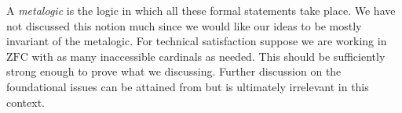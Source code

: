 \begin{remark}
    A \emph{metalogic} is the logic in which all these formal statements take place. We have not discussed this notion much since we would like our ideas to be mostly invariant of the metalogic. For technical satisfaction suppose we are working in $\mathrm{ZFC}$ with as many inaccessible cardinals as needed. This should be sufficiently strong enough to prove what we discussing. Further discussion on the foundational issues can be attained from \cite{2008arXiv0810.1279S, 2019arXiv190407004S, 2012arXiv1211.2851K} but is ultimately irrelevant in this context.
\end{remark}



